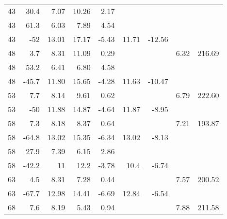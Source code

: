 \begin{table}[H]
\begin{tabular}{|r|r|r|r|r|r|r|r|r|}
            43 &       30.4 &       7.07 &      10.26 &       2.17 &            &            &            &            \\
    
            43 &       61.3 &       6.03 &       7.89 &       4.54 &            &            &            &            \\
    
            43 &        -52 &      13.01 &      17.17 &      -5.43 &      11.71 &     -12.56 &            &            \\
    \hline
            48 &        3.7 &       8.31 &      11.09 &       0.29 &            &            &       6.32 &     216.69 \\
    
            48 &       53.2 &       6.41 &       6.80 &       4.58 &            &            &            &            \\
    
            48 &      -45.7 &      11.80 &      15.65 &      -4.28 &      11.63 &     -10.47 &            &            \\
    \hline
            53 &        7.7 &       8.14 &       9.61 &       0.62 &            &            &       6.79 &     222.60 \\
    
            53 &        -50 &      11.88 &      14.87 &      -4.64 &      11.87 &      -8.95 &            &            \\
    \hline
            58 &        7.3 &       8.18 &       8.37 &       0.64 &            &            &       7.21 &     193.87 \\
    
            58 &      -64.8 &      13.02 &      15.35 &      -6.34 &      13.02 &      -8.13 &            &            \\

            58 &        27.9 &       7.39 &       6.15 &       2.86 &            &            &        &      \\
    
            58 &      -42.2 &      11 &      12.2 &      -3.78 &       10.4 &      -6.74 &            &            \\
    \hline
            63 &        4.5 &       8.31 &       7.28 &       0.44 &            &            &       7.57 &     200.52 \\
    
            63 &      -67.7 &      12.98 &      14.41 &      -6.69 &      12.84 &      -6.54 &            &            \\
    \hline
            68 &        7.6 &       8.19 &       5.43 &       0.94 &            &            &       7.88 &     211.58 \\
    

\end{tabular}
\end{table}
